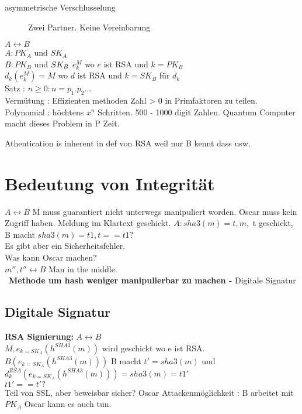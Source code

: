 \documentclass[a4paper,10pt]{scrreprt}
\begin{document}
\begin{description}
 \item [asymmetrische Verschlusselung] Zwei Partner. Keine Vereinbarung
\end{description}
$ A \longleftrightarrow B$\\
$ A : PK_{A} $ und $SK_{A}$\\
$ B : PK_{B}$ und $SK_{B} \\$
$ e_k^{M} $ wo $e$ ist RSA und $k=PK_B$ \\
$ d_k(e_k^{M}) = M$ wo $d$ ist RSA und $k = SK_B$ für $d_k$\\

Satz : $n \ge 0 : n = p_1.p_2...$ \\
Vermütung : Effizienten methoden Zahl > 0 in Primfaktoren zu teilen.
Polynomial : höchtens $x^n$ Schritten.
500 - 1000 digit Zahlen.  Quantum Computer macht dieses Problem in P Zeit.

Athentication is inherent in def von RSA weil nur B kennt dass usw.

\section{Bedeutung von Integrität}
$ A \longleftrightarrow B $
M muss guarantiert nicht unterwegs manipuliert worden.
Oscar muss kein Zugriff haben. Meldung im Klartext geschickt.
$ A : sha3(m) = t, m,$  t geschickt, B macht $sha3(m) = t1, t==t1?$\\
Es gibt aber ein Sicherheitsfehler. \\
Was kann Oscar machen? \\
$ m'' ,t'' \longleftrightarrow B $  Man in the middle. \\\
\textbf{Methode um hash weniger manipulierbar zu machen -} Digitale Signatur \\

\subsection{Digitale Signatur}
\textbf{RSA Signierung:}
$A \longleftrightarrow B$ \\
$M,e_{k=SK_A}(h^{SHA3}(m))$ wird geschickt wo e ist RSA.\\
$B(e_{k=SK_A}(h^{SHA3}(m)))$ B macht $t' = sha3(m)$ und $d^{RSA}_k(e_{k=SK_A}(h^{SHA3}(m))) = sha3(m)= t1'$\\
$ t1' == t'?$ \\
Teil von SSL, aber beweisbar sicher? Oscar Attackenmöglichkeit : B arbeitet mit $PK_A$ Oscar kann es auch tun.\\
\end{document}
